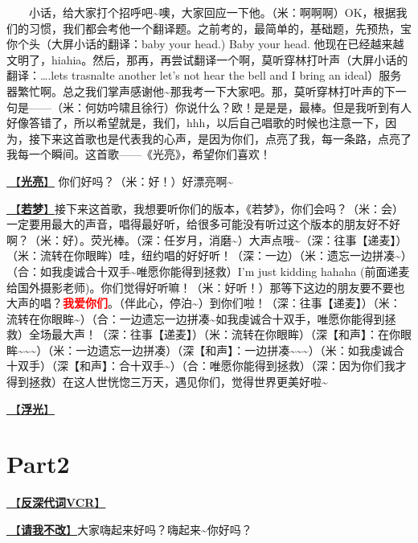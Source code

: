\documentclass[]{ctexbook}
\begin{document}
  小话，给大家打个招呼吧\textasciitilde 噢，大家回应一下他。（米：啊啊啊）OK，根据我们的习惯，我们都会考他一个翻译题。之前考的，最简单的，基础题，先预热，宝你个头（大屏小话的翻译：baby your head.) Baby your head. 他现在已经越来越文明了，hiahia。然后，那再，再尝试翻译一个啊，莫听穿林打叶声（大屏小话的翻译：\ldots.lets trasnalte another let's not hear the bell and I bring an ideal）服务器繁忙啊。总之我们掌声感谢他\textasciitilde 那我考一下大家吧。那，莫听穿林打叶声的下一句是------（米：何妨吟啸且徐行）你说什么？欧！是是是，最棒。但是我听到有人好像答错了，所以希望就是，我们，hhh，以后自己唱歌的时候也注意一下，因为，接下来这首歌也是代表我的心声，是因为你们，点亮了我，每一条路，点亮了我每一个瞬间。这首歌------《光亮》，希望你们喜欢！

\hyperref[silver-linings]{🎵【\textbf{光亮}】} 你们好吗？（米：好！）好漂亮啊\textasciitilde{}

\hyperref[ruomeng]{🎵【\textbf{若梦}】}接下来这首歌，我想要听你们的版本，《若梦》，你们会吗？（米：会）一定要用最大的声音，唱得最好听，给很多可能没有听过这个版本的朋友好不好啊？（米：好）。荧光棒。（深：任岁月，消磨\textasciitilde）大声点哦\textasciitilde（深：往事【递麦】）（米：流转在你眼眸）哇，纽约唱的好好听！（深：一边）（米：遗忘一边拼凑\textasciitilde）（合：如我虔诚合十双手\textasciitilde 唯愿你能得到拯救）I'm just kidding hahaha (前面递麦给国外摄影老师)。你们觉得好听嘛！（米：好听！）那等下这边的朋友要不要也大声的唱？\textbf{\textcolor{red}{我爱你们}}。（伴此心，停泊\textasciitilde）到你们啦！（深：往事【递麦】）（米：流转在你眼眸\textasciitilde）（合：一边遗忘一边拼凑\textasciitilde 如我虔诚合十双手，唯愿你能得到拯救）全场最大声！（深：往事【递麦】）（米：流转在你眼眸）（深【和声】：在你眼眸\textasciitilde\textasciitilde\textasciitilde）（米：一边遗忘一边拼凑）（深【和声】：一边拼凑\textasciitilde\textasciitilde\textasciitilde）（米：如我虔诚合十双手）（深【和声】：合十双手\textasciitilde）（合：唯愿你能得到拯救）（深：因为你们我才得到拯救）在这人世恍惚三万天，遇见你们，觉得世界更美好啦\textasciitilde{}

\hyperref[floating-light]{🎵【\textbf{浮光}】}

\section{Part2}\label{NewYork-20250309-part2}

\hyperref[senself-vcr]{🎥【\textbf{反深代词VCR}】}

\hyperref[brave-heart]{🎵【\textbf{请我不改}】}大家嗨起来好吗？嗨起来\textasciitilde 你好吗？
\end{document}
